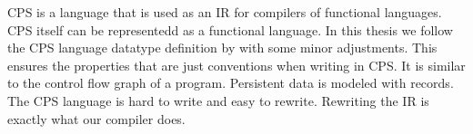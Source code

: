 \ac{CPS} is a language that is used as an \ac{IR} for compilers of functional languages\autocite{steele1978rabbit, DBLP:books/daglib/0022396}. \ac{CPS} itself can be representedd as a functional language. In this thesis we follow the \ac{CPS} language datatype definition by \citeauthor{DBLP:books/daglib/0022396} with some minor adjustments. This ensures the properties that are just conventions when writing in \ac{CPS}. It is similar to the control flow graph of a program. Persistent data is modeled with records. The \ac{CPS} language is hard to write and easy to rewrite. Rewriting the \ac{IR} is exactly what our compiler does.

